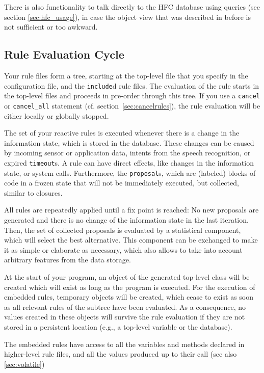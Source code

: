 There is also functionality to talk directly to the HFC database using queries
(see section \ref{sec:hfc_usage}), in case the object view that was
described in before is not sufficient or too awkward.

\subsection{Rule Evaluation Cycle}
\label{sec:ruleevaluation}

Your \vonda rule files form a tree, starting at the top-level file that you
specify in the configuration file, and the \texttt{include}d rule files. The
evaluation of the rule starts in the top-level files and proceeds in pre-order
through this tree. If you use a \texttt{cancel} or \texttt{cancel\_all}
statement (cf. section~\ref{sec:cancelrules}), the rule evaluation will be
either locally or globally stopped.

The set of your reactive \vonda rules is executed whenever there is a change in
the information state, which is stored in the database. These changes can be
caused by incoming sensor or application data, intents from the speech
recognition, or expired \texttt{timeout}s.  A rule can have direct effects,
like changes in the information state, or system calls. Furthermore, the
\texttt{proposal}s, which are (labeled) blocks of code in a frozen state that
will not be immediately executed, but collected, similar to closures.

All rules are repeatedly applied until a fix point is reached: No new proposals
are generated and there is no change of the information state in the last
iteration. Then, the set of collected proposals is evaluated by a statistical
component, which will select the best alternative. This component can be
exchanged to make it as simple or elaborate as necessary, which also allows to
take into account arbitrary features from the data storage.

At the start of your program, an object of the generated top-level
class will be created which will exist as long as the program is
executed. For the execution of embedded rules, temporary objects will
be created, which cease to exist as soon as all relevant rules of the
subtree have been evaluated. As a consequence, no values created in
these objects will survive the rule evaluation if they are not stored
in a persistent location (e.g., a top-level variable or the database).

The embedded rules have access to all the variables and methods
declared in higher-level rule files, and all the values produced up to
their call (see also \ref{sec:volatile})


